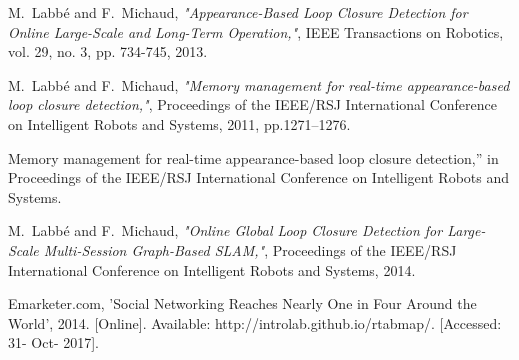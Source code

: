 \documentclass[journal]{IEEEtran}
\begin{document}
%
%
%
\begin{thebibliography}{1}

M.~Labbé and F.~Michaud, \emph{"Appearance-Based Loop Closure Detection for Online Large-Scale and Long-Term Operation,"},
IEEE Transactions on Robotics, vol. 29, no. 3, pp. 734-745, 2013.

M.~Labbé and F.~Michaud, \emph{"Memory management for real-time appearance-based loop closure detection,"},
Proceedings of the IEEE/RSJ International Conference on Intelligent Robots and Systems, 2011, pp.1271–1276.

Memory management for real-time appearance-based loop closure detection,” in Proceedings of the IEEE/RSJ International Conference on Intelligent Robots and Systems.

M.~Labbé and F.~Michaud, \emph{"Online Global Loop Closure Detection for Large-Scale Multi-Session Graph-Based SLAM,"},
Proceedings of the IEEE/RSJ International Conference on Intelligent Robots and Systems, 2014.

Emarketer.com, 'Social Networking Reaches Nearly One in Four Around the World', 2014. [Online]. Available: 
http://introlab.github.io/rtabmap/. 
[Accessed: 31- Oct- 2017].

\end{thebibliography}
\end{document}
